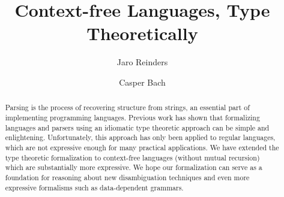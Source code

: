 \documentclass[runningheads]{llncs}
\begin{document}
%
\title{Context-free Languages, Type Theoretically}
%
%
\author{Jaro Reinders \and
Casper Bach}
%


\maketitle              %

\begin{abstract}
Parsing is the process of recovering structure from strings, an essential part of implementing programming languages.
Previous work has shown that formalizing languages and parsers using an idiomatic type theoretic approach can be simple and enlightening.
Unfortunately, this approach has only been applied to regular languages, which are not expressive enough for many practical applications.
We have extended the type theoretic formalization to context-free languages (without mutual recursion) which are substantially more expressive.
We hope our formalization can serve as a foundation for reasoning about new disambiguation techniques and even more expressive formalisms such as data-dependent grammars.
\end{abstract}

%
%
\end{document}
